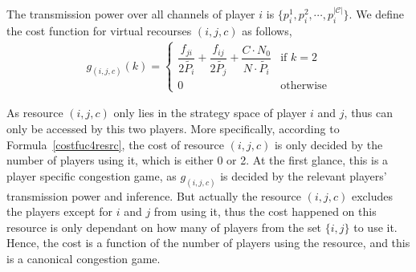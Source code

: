 The transmission power over all channels of player $i$ is $\{p_i^1, p_i^2,\cdots, p_i^{|\mathcal{C}|}\}$.
We define the cost function for virtual recourses $(i,j,c)$ as follows,
\begin{equation}
\label{costfuc4resrc}
\begin{split}
g_{(i,j,c)}(k) = 
\left\{ \begin{array}{ll}
\dfrac{f_{ji}}{2\tilde{P_i}} + \dfrac{f_{ij}}{2\tilde{P_j}} + \dfrac{C\cdot N_0}{N\cdot \tilde{P_i}} & \mbox{if $k=2$} \\
0 & \mbox{otherwise}
\end{array}
\right.
\end{split}
\end{equation}


As resource $(i,j,c)$ only lies in the strategy space of player $i$ and $j$, thus can only be accessed by this two players.
More specifically, according to Formula~\ref{costfuc4resrc}, the cost of resource $(i,j,c)$ is only decided by the number of players using it, which is either 0 or 2.
At the first glance, this is a player specific congestion game, as $g_{(i,j,c)}$ is decided by the relevant players' transmission power and inference.
But actually the resource ${(i,j,c)}$ excludes the players except for $i$ and $j$ from using it, thus the cost happened on this resource is only dependant on how many of players from the set $\{i, j\}$ to use it.
Hence, the cost is a function of the number of players using the resource, and this is a canonical congestion game.

